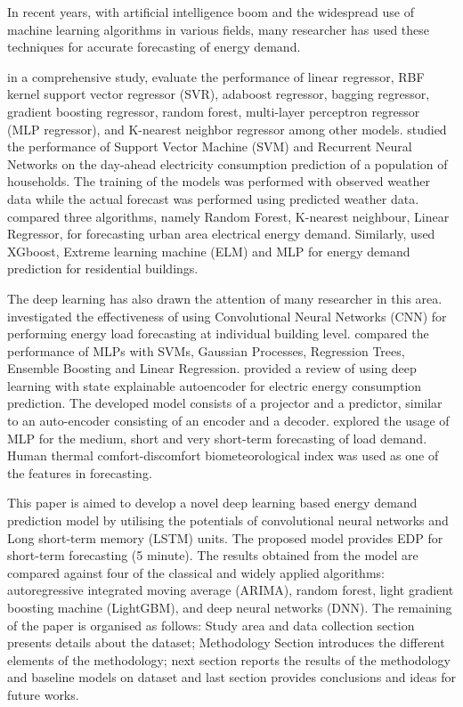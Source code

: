 \documentclass[twocolumn, a4paper,10pt]{article}
\begin{document}
In recent years, with artificial intelligence boom and the widespread use of machine learning algorithms in various fields, many researcher has used these techniques for accurate forecasting of energy demand. 

\cite{RN21} in a comprehensive study, evaluate the performance of linear regressor, RBF kernel support vector regressor (SVR), adaboost regressor, bagging regressor, gradient boosting regressor, random forest, multi-layer perceptron regressor (MLP regressor), and K-nearest neighbor regressor among other models. \cite{RN1199} studied the performance of Support Vector Machine (SVM) and Recurrent Neural Networks on the day-ahead electricity consumption prediction of a population of households. The training of the models was performed with observed weather data while the actual forecast was performed using predicted weather data. \cite{RN1194} compared three algorithms, namely Random Forest, K-nearest neighbour, Linear Regressor, for forecasting urban area electrical energy demand. Similarly, \cite{RN1197} used XGboost, Extreme learning machine (ELM) and MLP for energy demand prediction for residential buildings.

The deep learning has also drawn the attention of many researcher in this area. \cite{RN13} investigated the effectiveness of using Convolutional Neural Networks (CNN) for performing energy load forecasting at individual building level. \cite{RN29} compared the performance of MLPs with SVMs, Gaussian Processes, Regression Trees, Ensemble Boosting and Linear Regression. \cite{RN1195} provided a review of using deep learning with state explainable autoencoder for electric energy consumption prediction. The developed model consists of a projector and a predictor, similar to an auto-encoder consisting of an encoder and a decoder. \cite{RN59} explored the usage of MLP for the medium, short and very short-term forecasting of load demand. Human thermal comfort-discomfort biometeorological index was used as one of the features in forecasting.

This paper is aimed to develop a novel deep learning based energy demand prediction model by utilising the potentials of convolutional neural networks and Long short-term memory (LSTM) units. The proposed model provides EDP for short-term forecasting (5 minute). The results obtained from the model are compared against four of the classical and widely applied algorithms: autoregressive integrated moving average (ARIMA), random forest, light gradient boosting machine (LightGBM), and deep neural networks (DNN). The remaining of the paper is organised as follows: Study area and data collection section presents details about the dataset; Methodology Section introduces the different elements of the methodology; next section reports the results of the methodology and baseline models on dataset and last section provides conclusions and ideas for future works.
\end{document}

